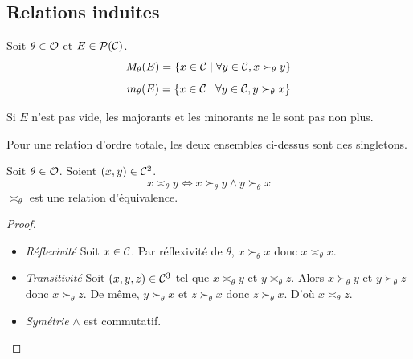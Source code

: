 \subsection{Relations induites}

\begin{definition}
	Soit $\theta \in \mathcal{O}$ et $E \in \mathcal{P}(\mathcal{C})$.
	\begin{equation*}
		M_\theta (E) = \left\{ x \in \mathcal{C} \;|\; \forall y \in \mathcal{C}, x \succ_\theta y \right\}
	\end{equation*}
	\begin{equation*}
		m_\theta (E) = \left\{ x \in \mathcal{C} \;|\; \forall y \in \mathcal{C}, y \succ_\theta x \right\}
	\end{equation*}
\end{definition}

\begin{proposition}
	Si $E$ n'est pas vide, les majorants et les minorants ne le sont pas non plus.
\end{proposition}

\begin{proposition}
	Pour une relation d'ordre totale, les deux ensembles ci-dessus sont des singletons.
\end{proposition}

\begin{definition}
	Soit $\theta \in \mathcal{O}$. Soient $(x, y) \in \mathcal{C}^2$.
	\begin{equation}
		x \asymp_\theta y \iff x \succ_\theta y \wedge y \succ_\theta x
	\end{equation}
	$\asymp_\theta$ est une relation d'équivalence.
\end{definition}

\begin{proof}
	~\newline
	\begin{itemize}
		\item \textit{Réflexivité} Soit $x \in \mathcal{C}$. Par réflexivité de $\theta$, $x \succ_\theta x$ donc $x \asymp_\theta x$.
		\item \textit{Transitivité} Soit $(x, y, z) \in \mathcal{C}^3$ tel que $x \asymp_\theta y$ et $y \asymp_\theta z$.
		Alors $x \succ_\theta y$ et $y \succ_\theta z$ donc $x \succ_\theta z$.
		De même, $y \succ_\theta x$ et $z \succ_\theta x$ donc $z \succ_\theta x$.
		D'où $x \asymp_\theta z$.
		\item \textit{Symétrie} $\wedge$ est commutatif.
	\end{itemize}
\end{proof}

